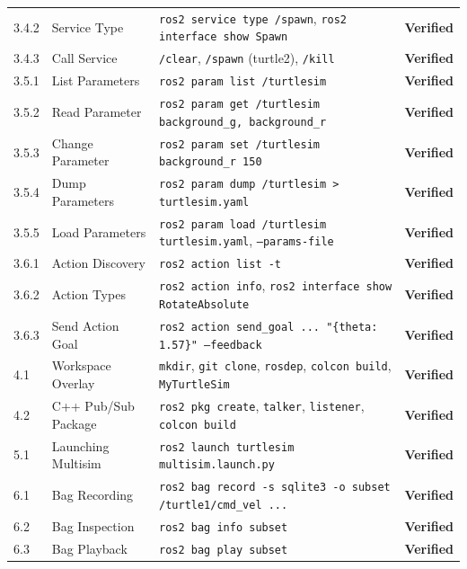 \documentclass[11pt,a4paper]{article}
\begin{document}
\begin{center}
\begin{tabular}{ll>{\raggedright\arraybackslash}p{8.5cm}c}
3.4.2 & Service Type & \texttt{ros2 service type /spawn}, \texttt{ros2 interface show Spawn} & \textcolor{primary}{\textbf{Verified}} \\
3.4.3 & Call Service & \texttt{/clear}, \texttt{/spawn} (turtle2), \texttt{/kill} & \textcolor{primary}{\textbf{Verified}} \\
\midrule
3.5.1 & List Parameters & \texttt{ros2 param list /turtlesim} & \textcolor{primary}{\textbf{Verified}} \\
3.5.2 & Read Parameter & \texttt{ros2 param get /turtlesim background\_g, background\_r} & \textcolor{primary}{\textbf{Verified}} \\
3.5.3 & Change Parameter & \texttt{ros2 param set /turtlesim background\_r 150} & \textcolor{primary}{\textbf{Verified}} \\
3.5.4 & Dump Parameters & \texttt{ros2 param dump /turtlesim > turtlesim.yaml} & \textcolor{primary}{\textbf{Verified}} \\
3.5.5 & Load Parameters & \texttt{ros2 param load /turtlesim turtlesim.yaml}, \texttt{--params-file} & \textcolor{primary}{\textbf{Verified}} \\
\midrule
3.6.1 & Action Discovery & \texttt{ros2 action list -t} & \textcolor{primary}{\textbf{Verified}} \\
3.6.2 & Action Types & \texttt{ros2 action info}, \texttt{ros2 interface show RotateAbsolute} & \textcolor{primary}{\textbf{Verified}} \\
3.6.3 & Send Action Goal & \texttt{ros2 action send\_goal ... "\{theta: 1.57\}" --feedback} & \textcolor{primary}{\textbf{Verified}} \\
\midrule
4.1 & Workspace Overlay & \texttt{mkdir}, \texttt{git clone}, \texttt{rosdep}, \texttt{colcon build}, \texttt{MyTurtleSim} & \textcolor{primary}{\textbf{Verified}} \\
4.2 & C++ Pub/Sub Package & \texttt{ros2 pkg create}, \texttt{talker}, \texttt{listener}, \texttt{colcon build} & \textcolor{primary}{\textbf{Verified}} \\
\midrule
5.1 & Launching Multisim & \texttt{ros2 launch turtlesim multisim.launch.py} & \textcolor{primary}{\textbf{Verified}} \\
6.1 & Bag Recording & \texttt{ros2 bag record -s sqlite3 -o subset /turtle1/cmd\_vel ...} & \textcolor{primary}{\textbf{Verified}} \\
6.2 & Bag Inspection & \texttt{ros2 bag info subset} & \textcolor{primary}{\textbf{Verified}} \\
6.3 & Bag Playback & \texttt{ros2 bag play subset} & \textcolor{primary}{\textbf{Verified}} \\

\end{tabular}
\end{center}
\end{document}
